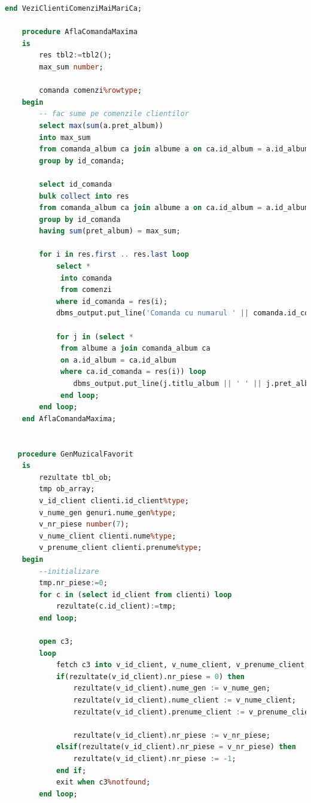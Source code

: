 \documentclass{article}
\begin{document}
\begin{lstlisting}[language=SQL, title=Cerinta 13]
    end VeziClientiComenziMaiMariCa;
    
    procedure AflaComandaMaxima 
    is
        res tbl2:=tbl2();
        max_sum number;
        
        comanda comenzi%rowtype;
    begin
        -- fac sume pe comenzile clientilor
        select max(sum(a.pret_album)) 
        into max_sum
        from comanda_album ca join albume a on ca.id_album = a.id_album
        group by id_comanda;
         
        select id_comanda
        bulk collect into res
        from comanda_album ca join albume a on ca.id_album = a.id_album
        group by id_comanda
        having sum(pret_album) = max_sum;
         
        for i in res.first .. res.last loop
            select *
             into comanda
             from comenzi
            where id_comanda = res(i);
            dbms_output.put_line('Comanda cu numarul ' || comanda.id_comanda || ' efectuata la data: ' || comanda.data_comanda || ' are valoarea ' || max_sum || ' lei si contine albumele: ');
            
            for j in (select * 
             from albume a join comanda_album ca
             on a.id_album = ca.id_album
             where ca.id_comanda = res(i)) loop
                dbms_output.put_line(j.titlu_album || ' ' || j.pret_album);
             end loop;
        end loop;
    end AflaComandaMaxima;


   procedure GenMuzicalFavorit
    is
        rezultate tbl_ob;
        tmp ob_array;
        v_id_client clienti.id_client%type;
        v_nume_gen genuri.nume_gen%type;
        v_nr_piese number(7);
        v_nume_client clienti.nume%type;
        v_prenume_client clienti.prenume%type;
    begin
        --initializare
        tmp.nr_piese:=0;
        for c in (select id_client from clienti) loop
            rezultate(c.id_client):=tmp;
        end loop;
    
        open c3;
        loop
            fetch c3 into v_id_client, v_nume_client, v_prenume_client, v_nume_gen, v_nr_piese;
            if(rezultate(v_id_client).nr_piese = 0) then
                rezultate(v_id_client).nume_gen := v_nume_gen;
                rezultate(v_id_client).nume_client := v_nume_client;
                rezultate(v_id_client).prenume_client := v_prenume_client;
    
                rezultate(v_id_client).nr_piese := v_nr_piese;
            elsif(rezultate(v_id_client).nr_piese = v_nr_piese) then
                rezultate(v_id_client).nr_piese := -1;
            end if;
            exit when c3%notfound;
        end loop;
        

\end{lstlisting}
\end{document}
